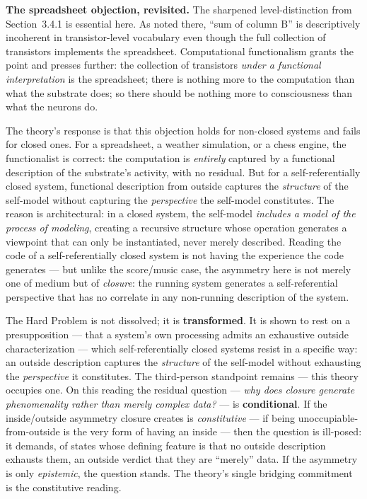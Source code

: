 \documentclass[12pt]{article}
\newcommand{\revstart}{}
\begin{document}
{\revstart\textbf{The spreadsheet objection, revisited.} The sharpened level-distinction from Section~3.4.1 is essential here. As noted there, ``sum of column B'' is descriptively incoherent in transistor-level vocabulary even though the full collection of transistors implements the spreadsheet. Computational functionalism grants the point and presses further: the collection of transistors \emph{under a functional interpretation} is the spreadsheet; there is nothing more to the computation than what the substrate does; so there should be nothing more to consciousness than what the neurons do.

The theory's response is that this objection holds for non-closed systems and fails for closed ones. For a spreadsheet, a weather simulation, or a chess engine, the functionalist is correct: the computation is \emph{entirely} captured by a functional description of the substrate's activity, with no residual. But for a self-referentially closed system, functional description from outside captures the \emph{structure} of the self-model without capturing the \emph{perspective} the self-model constitutes. The reason is architectural: in a closed system, the self-model \emph{includes a model of the process of modeling}, creating a recursive structure whose operation generates a viewpoint that can only be instantiated, never merely described. Reading the code of a self-referentially closed system is not having the experience the code generates --- but unlike the score/music case, the asymmetry here is not merely one of medium but of \emph{closure}: the running system generates a self-referential perspective that has no correlate in any non-running description of the system.

The Hard Problem is not dissolved; it is \textbf{transformed}. It is shown to rest on a presupposition --- that a system's own processing admits an exhaustive outside characterization --- which self-referentially closed systems resist in a specific way: an outside description captures the \emph{structure} of the self-model without exhausting the \emph{perspective} it constitutes. The third-person standpoint remains --- this theory occupies one. On this reading the residual question --- \emph{why does closure generate phenomenality rather than merely complex data?} --- is \textbf{conditional}. If the inside/outside asymmetry closure creates is \emph{constitutive} --- if being unoccupiable-from-outside is the very form of having an inside --- then the question is ill-posed: it demands, of states whose defining feature is that no outside description exhausts them, an outside verdict that they are ``merely'' data. If the asymmetry is only \emph{epistemic}, the question stands. The theory's single bridging commitment is the constitutive reading.

}
\end{document}
